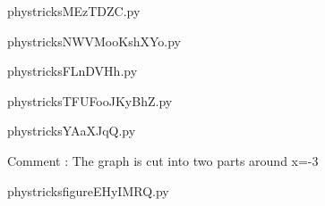 
    \newcommand{\CaptionFigMEzTDZC}{<+Type your caption here+>}
    \begin{center}
        
    \end{center}
    phystricksMEzTDZC.py

    

    \clearpage
    


    \newcommand{\CaptionFigNWVMooKshXYo}{<+Type your caption here+>}
    \begin{center}
        
    \end{center}
    phystricksNWVMooKshXYo.py

    

    \clearpage
    


    \newcommand{\CaptionFigFLnDVHh}{<+Type your caption here+>}
    \begin{center}
        
    \end{center}
    phystricksFLnDVHh.py

    

    \clearpage
    


    \newcommand{\CaptionFigTFUFooJKyBhZ}{<+Type your caption here+>}
    \begin{center}
        
    \end{center}
    phystricksTFUFooJKyBhZ.py

    

    \clearpage
    


    \newcommand{\CaptionFigYAaXJqQ}{<+Type your caption here+>}
    \begin{center}
        
    \end{center}
    phystricksYAaXJqQ.py

    Comment : The graph is cut into two parts around x=-3

    \clearpage
    


    \newcommand{\CaptionFigfigureEHyIMRQ}{<+Type your caption here+>}
    \begin{center}
        
    \end{center}
    phystricksfigureEHyIMRQ.py


